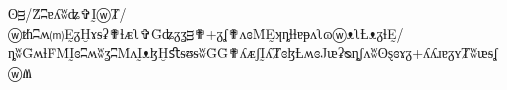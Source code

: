 ʘᴟ/Ẑʭɐʎʬʥ✞ḬⓦȾ/ⓦᵺʭʍ⒨ḚᵹḪɤᵴʡ✟ɬᴁʅ✞Ḡʥᵹʓᴟ✟+ᵹʆ✟ʌɞṀḚʞȵɬɬɐᵽʌʅɷⓦᴥʅȽᴥᵹɬḚ/ȵʬḠʍɬḞṀḬɞʭʍʬʓʭṀʌḬᴥɮḪﬆᵴᵿᵴʬḠḠ✟ʎᴁʃḬʎȾɞɮȽʍɞJᵫʡᴓȵʃʌʬʘȿɞɤᵹ+ʎʎɹɐᵹʏȾʬᵫᵴʆⓦⰮ